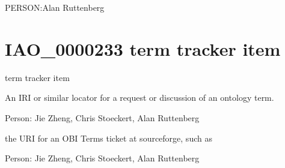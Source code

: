 \documentclass[letterpaper,10pt,english]{sphinxmanual}
\begin{document}
\begin{sphinxShadowBox}

\sphinxAtStartPar
PERSON:Alan Ruttenberg
\end{sphinxShadowBox}
\begin{quote}
\label{\detokenize{doc-IAO_0000233:iao-0000233}}\label{\detokenize{doc-IAO_0000233:term-tracker-item}}\label{\detokenize{doc-IAO_0000233:iao-0000233}}
\ignorespaces \end{quote}


\section{IAO\_0000233 \sphinxhyphen{} term tracker item}
\label{\detokenize{doc-IAO_0000233:iao-0000233-term-tracker-item}}\label{\detokenize{doc-IAO_0000233:index-0}}\label{\detokenize{doc-IAO_0000233::doc}}
\begin{sphinxShadowBox}

\sphinxAtStartPar
term tracker item
\end{sphinxShadowBox}

\begin{sphinxShadowBox}

\sphinxAtStartPar
An IRI or similar locator for a request or discussion of an ontology term.
\end{sphinxShadowBox}

\begin{sphinxShadowBox}

\sphinxAtStartPar
Person: Jie Zheng, Chris Stoeckert, Alan Ruttenberg
\end{sphinxShadowBox}

\begin{sphinxShadowBox}

\sphinxAtStartPar
the URI for an OBI Terms ticket at sourceforge, such as 
\end{sphinxShadowBox}

\begin{sphinxShadowBox}

\sphinxAtStartPar
Person: Jie Zheng, Chris Stoeckert, Alan Ruttenberg
\end{sphinxShadowBox}
\begin{quote}
\label{\detokenize{doc-IAO_0000412:iao-0000412}}\label{\detokenize{doc-IAO_0000412:imported-from}}\label{\detokenize{doc-IAO_0000412:iao-0000412}}
\ignorespaces \end{quote}
\end{document}
